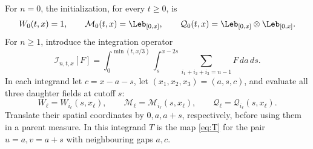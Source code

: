 \documentclass[11pt,letterpaper]{article}
\begin{document}
For $n=0$, the initialization, for every $t\ge0$, is
\begin{equation}\label{eq:marked-initial}
 W_0(t,x)=1,\qquad \mathcal M_0(t,x)=\Leb_{[0,x]},\qquad
 \mathcal Q_0(t,x)=\Leb_{[0,x]}\otimes\Leb_{[0,x]}.
\end{equation}
For $n\ge1$, introduce the integration operator
\[
 \mathcal I_{n,t,x}[F]=
 \int_0^{\min(t,x/3)}\!\int_s^{x-2s}
 \sum_{i_1+i_2+i_3=n-1} F\,da\,ds.
\]
In each integrand let $c=x-a-s$, let $(x_1,x_2,x_3)=(a,s,c)$, and
evaluate all three daughter fields at cutoff $s$:
\[
 W_\ell=W_{i_\ell}(s,x_\ell),\qquad
 \mathcal M_\ell=\mathcal M_{i_\ell}(s,x_\ell),\qquad
 \mathcal Q_\ell=\mathcal Q_{i_\ell}(s,x_\ell).
\]
Translate their spatial coordinates by $0,a,a+s$, respectively, before
using them in a parent measure. In this integrand $T$ is the map
\eqref{eq:T} for the pair $u=a,v=a+s$ with neighbouring gaps $a,c$.
\end{document}
